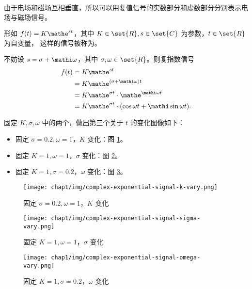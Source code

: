 \begin{example}[复值信号在电磁场中的应用]
    由于电场和磁场互相垂直，所以可以用复值信号的实数部分和虚数部分分别表示电场与磁场信号。
\end{example}

\begin{definition}[复指数信号]
    形如 $f(t) = K\mathe^{st}$，其中 $K \in \set{R}, s \in \set{C}$ 为参数，$t \in \set{R}$ 为自变量，
    这样的信号被称为。
\end{definition}

\begin{property}[复指数信号与正余弦信号之间的关系]
    不妨设 $s = \sigma + \mathi\omega$，其中 $\sigma, \omega \in \set{R}$。则复指数信号
    \begin{align*}
        f(t) & = K\mathe^{st} \\
        & = K\mathe^{(\sigma + \mathi\omega)t} \\
        & = K\mathe^{\sigma t} \cdot \mathe^{\mathi \omega t} \\
        & = K\mathe^{\sigma t} \cdot (\cos \omega t + \mathi \sin \omega t).
    \end{align*}

    固定 $K, \sigma, \omega$ 中的两个，做出第三个关于 $t$ 的变化图像如下：
    \begin{itemize}
        \item 固定 $\sigma = 0.2, \omega = 1$，$K$ 变化：图 \ref{fig:complex-exponential-signal-k-vary}。
        \item 固定 $K = 1, \omega = 1$，$\sigma$ 变化：图 \ref{fig:complex-exponential-signal-sigma-vary}。
        \item 固定 $K = 1, \sigma = 0.2$，$\omega$ 变化：图 \ref{fig:complex-exponential-signal-omega-vary}。
    \end{itemize}
    \begin{figure}[H]
        \centering
        \texttt{[image: chap1/img/complex-exponential-signal-k-vary.png]}
        \caption{固定 $\sigma = 0.2, \omega = 1$，$K$ 变化}
        \label{fig:complex-exponential-signal-k-vary}
    \end{figure}
    \begin{figure}[H]
        \centering
        \texttt{[image: chap1/img/complex-exponential-signal-sigma-vary.png]}
        \caption{固定 $K = 1, \omega = 1$，$\sigma$ 变化}
        \label{fig:complex-exponential-signal-sigma-vary}
    \end{figure}
    \begin{figure}[H]
        \centering
        \texttt{[image: chap1/img/complex-exponential-signal-omega-vary.png]}
        \caption{固定 $K = 1, \sigma = 0.2$，$\omega$ 变化}
        \label{fig:complex-exponential-signal-omega-vary}
    \end{figure}
\end{property}

